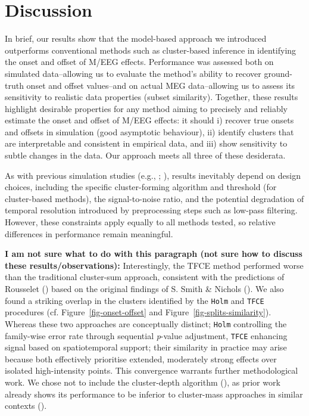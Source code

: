 \documentclass[
  doc,
  floatsintext,
  longtable,
  a4paper,
  nolmodern,
  notxfonts,
  notimes,
  colorlinks=true,linkcolor=blue,citecolor=blue,urlcolor=blue]{apa7}
\begin{document}
\section{Discussion}\label{discussion}

In brief, our results show that the model-based approach we introduced
outperforms conventional methods such as cluster-based inference in
identifying the onset and offset of M/EEG effects. Performance was
assessed both on simulated data--allowing us to evaluate the method's
ability to recover ground-truth onset and offset values--and on actual
MEG data--allowing us to assess its sensitivity to realistic data
properties (subset similarity). Together, these results highlight
desirable properties for any method aiming to precisely and reliably
estimate the onset and offset of M/EEG effects: it should i) recover
true onsets and offsets in simulation (good asymptotic behaviour), ii)
identify clusters that are interpretable and consistent in empirical
data, and iii) show sensitivity to subtle changes in the data. Our
approach meets all three of these desiderata.

As with previous simulation studies (e.g.,
;
), results
inevitably depend on design choices, including the specific
cluster-forming algorithm and threshold (for cluster-based methods), the
signal-to-noise ratio, and the potential degradation of temporal
resolution introduced by preprocessing steps such as low-pass filtering.
However, these constraints apply equally to all methods tested, so
relative differences in performance remain meaningful.

\textbf{I am not sure what to do with this paragraph (not sure how to
discuss these results/observations):} Interestingly, the TFCE method
performed worse than the traditional cluster-sum approach, consistent
with the predictions of Rousselet
() based on the original
findings of S. Smith \& Nichols (). We
also found a striking overlap in the clusters identified by the
\texttt{Holm} and \texttt{TFCE} procedures (cf.
Figure~\ref{fig-onset-offset} and Figure~\ref{fig-splits-similarity}).
Whereas these two approaches are conceptually distinct; \texttt{Holm}
controlling the family-wise error rate through sequential \emph{p}-value
adjustment, \texttt{TFCE} enhancing signal based on spatiotemporal
support; their similarity in practice may arise because both effectively
prioritise extended, moderately strong effects over isolated
high-intensity points. This convergence warrants further methodological
work. We chose not to include the cluster-depth algorithm
(), as prior work
already shows its performance to be inferior to cluster-mass approaches
in similar contexts ().
\end{document}
